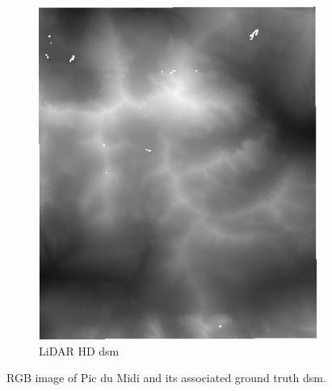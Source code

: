 \begin{figure}
\begin{subfigure}[t]{0.48\linewidth}
        \includegraphics[width=\linewidth]{Images/Chap_6/miniature_Pic_du_midi_gt.png}
        \caption{LiDAR HD \acrshort{dsm}}
        \label{fig:miniature_pic_du_midi_gt}
    \end{subfigure}
    \caption{RGB image of Pic du Midi and its associated ground truth \acrshort{dsm}.}
    \label{fig:miniature_pic_du_midi}
\end{figure}

